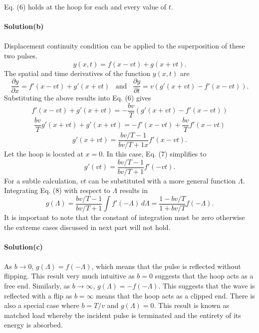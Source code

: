 \documentclass[12pt,a4paper]{article}
\begin{document}
Eq. (6) holds at the hoop for each and every value of $t$.
\\
\\\textbf{Solution(b)}
\\
\\Displacement continuity condition can be applied to the superposition of these two pulses.
\[y(x,t)=f(x-vt)+g(x+vt).\]
The spatial and time derivatives of the function $y(x,t)$ are
\[\frac{\partial y}{\partial x}=f'(x-vt)+g'(x+vt)\,\,\,\,\,\text{and}\,\,\,\,\,\frac{\partial y}{\partial t}=v\left(g'(x+vt)-f'(x-vt)\right).\]
Substituting the above results into Eq. (6) gives
\[f'(x-vt)+g'(x+vt)=-\frac{bv}{T}\left(g'(x+vt)-f'(x-vt)\right)\]
\[\frac{bv}{T}g'(x+vt)+g'(x+vt)=-f'(x-vt)+\frac{bv}{T}f'(x-vt)\]
\begin{equation}
    g'(x+vt)=\frac{bv/T-1}{bv/T+1x}f'(x-vt).
\end{equation}
Let the hoop is located at $x=0$. In this case, Eq. (7) simplifies to
\begin{equation}
    g'(vt)=\frac{bv/T-1}{bv/T+1}f'(-vt).
\end{equation}
For a subtle calculation, $vt$ can be substituted with a more general function $\Lambda$. Integrating Eq. (8) with respect to $\Lambda$ results in
\[g(\Lambda)=\frac{bv/T-1}{bv/T+1}\int f'(-\Lambda)\,d\Lambda=\frac{1-bv/T}{1+bv/T}f(-\Lambda).\]
It is important to note that the constant of integration must be zero otherwise the extreme cases discussed in next part will not hold.
\\
\\\textbf{Solution(c)}
\\
\\As $b\rightarrow0$, $g(\Lambda)=f(-\Lambda)$, which means that the pulse is reflected without flipping. This result very much intuitive as $b=0$ suggests that the hoop acts as a free end. Similarly, as $b\rightarrow\infty$, $g(\Lambda)=-f(-\Lambda)$. This suggests that the wave is reflected with a flip as $b=\infty$ means that the hoop acts as a clipped end. There is also a special case where $b=T/v$ and $g(\Lambda)=0$. This result is known as matched load whereby the incident pulse is terminated and the entirety of its energy is absorbed.
\end{document}

